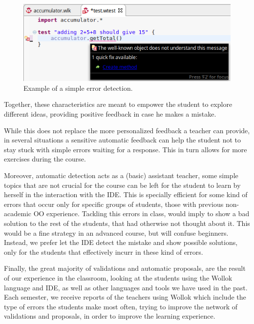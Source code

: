 \begin{figure}[ht]
 \centering
 \includegraphics[scale=0.5]{images/errorReporting.png}
 \caption{\small Example of a simple error detection.}
 \label{fig:errorReporting}
\end{figure}

\medskip
Together, these characteristics are meant to empower the student to explore different ideas, 
providing positive feedback in case he makes a mistake.

While this does not replace the more personalized feedback a teacher can provide, in several situations a sensitive automatic feedback can help the student not to stay stuck with simple errors waiting for a response.
This in turn allows for more exercises during the course.

Moreover, automatic detection acts as a (basic) assistant teacher, \ie some simple topics that are not crucial for the course can be left for the student to learn by herself in the interaction with the IDE.
This is specially efficient for some kind of errors that occur only for specific groups of students, \eg those with previous non-academic OO experience. 
Tackling this errors in class, would imply to show a bad solution to the rest of the students, that had otherwise not thought about it. This would be a fine strategy in an advanced course, but will confuse beginners.
Instead, we prefer let the IDE detect the mistake and show possible solutions, only for the students that effectively incurr in these kind of errors.

\medskip


Finally, the great majority of validations and automatic proposals, are the result of our experience in the classroom, looking at the students using the Wollok language and IDE, as well as other languages and tools we have used in the past.
Each semester, we receive reports of the teachers using Wollok which include the type of errors the students make most often, trying to improve the network of validations and proposals, in order to improve the learning experience.

